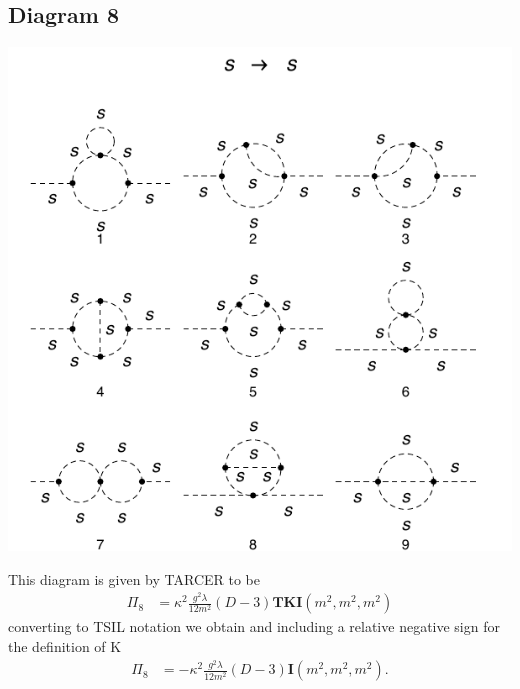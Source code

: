 \documentclass[11pt]{article}
\begin{document}
\subsection*{Diagram 8}
\noindent\begin{minipage}{0.3\textwidth}
\begin{center}
\includegraphics{2loop_8.pdf}
\end{center}
\end{minipage}
\noindent\begin{minipage}{0.7\textwidth}
This diagram is given by TARCER to be
\begin{align}
\Pi_8 & =  \kappa^2\frac{g^2 \lambda}{12 m^2 } (D-3) \mathbf{TKI}(m^2,m^2,m^2)
\end{align}
converting to TSIL notation we obtain and including a relative negative sign for the definition of K 
\begin{align}
\Pi_8 & =  -\kappa^2\frac{g^2 \lambda}{12 m^2 } (D-3) \mathbf{I}(m^2,m^2,m^2).
\end{align}
\end{minipage}
\end{document}
